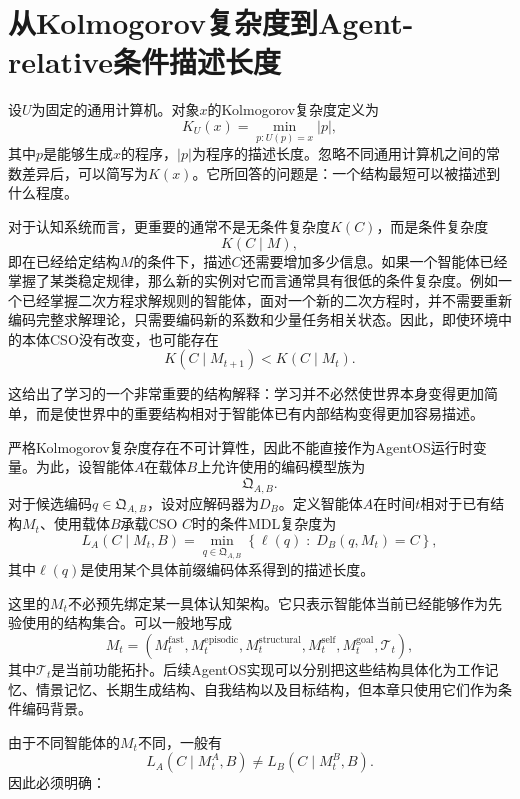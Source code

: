 \section{从Kolmogorov复杂度到Agent-relative条件描述长度}

设$U$为固定的通用计算机。对象$x$的Kolmogorov复杂度定义为
\[
K_U(x)
=
\min_{p:U(p)=x}|p|,
\]
其中$p$是能够生成$x$的程序，$|p|$为程序的描述长度。忽略不同通用计算机之间的常数差异后，可以简写为$K(x)$。它所回答的问题是：一个结构最短可以被描述到什么程度。

对于认知系统而言，更重要的通常不是无条件复杂度$K(C)$，而是条件复杂度
\[
K(C\mid M),
\]
即在已经给定结构$M$的条件下，描述$C$还需要增加多少信息。如果一个智能体已经掌握了某类稳定规律，那么新的实例对它而言通常具有很低的条件复杂度。例如一个已经掌握二次方程求解规则的智能体，面对一个新的二次方程时，并不需要重新编码完整求解理论，只需要编码新的系数和少量任务相关状态。因此，即使环境中的本体CSO没有改变，也可能存在
\[
K(C\mid M_{t+1})
<
K(C\mid M_t).
\]

这给出了学习的一个非常重要的结构解释：学习并不必然使世界本身变得更加简单，而是使世界中的重要结构相对于智能体已有内部结构变得更加容易描述。

严格Kolmogorov复杂度存在不可计算性，因此不能直接作为AgentOS运行时变量。为此，设智能体$A$在载体$B$上允许使用的编码模型族为
\[
\mathfrak{Q}_{A,B}.
\]
对于候选编码$q\in\mathfrak{Q}_{A,B}$，设对应解码器为$D_B$。定义智能体$A$在时间$t$相对于已有结构$M_t$、使用载体$B$承载CSO $C$时的条件MDL复杂度为
\[
\boxed{
L_A(C\mid M_t,B)
=
\min_{q\in\mathfrak{Q}_{A,B}}
\left\{
\ell(q)
\;:\;
D_B(q,M_t)=C
\right\},
}
\]
其中$\ell(q)$是使用某个具体前缀编码体系得到的描述长度。

这里的$M_t$不必预先绑定某一具体认知架构。它只表示智能体当前已经能够作为先验使用的结构集合。可以一般地写成
\[
M_t
=
\left(
M_t^{\mathrm{fast}},
M_t^{\mathrm{episodic}},
M_t^{\mathrm{structural}},
M_t^{\mathrm{self}},
M_t^{\mathrm{goal}},
\mathcal{T}_t
\right),
\]
其中$\mathcal{T}_t$是当前功能拓扑。后续AgentOS实现可以分别把这些结构具体化为工作记忆、情景记忆、长期生成结构、自我结构以及目标结构，但本章只使用它们作为条件编码背景。

由于不同智能体的$M_t$不同，一般有
\[
L_A(C\mid M_t^A,B)
\neq
L_B(C\mid M_t^B,B).
\]
因此必须明确：

\begin{statementbox}
\centering
{}
\end{statementbox}

